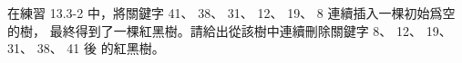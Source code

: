 \startEXERCISE
在練習 13.3-2 中，將關鍵字 41、 38、 31、 12、 19、 8 連續插入一棵初始爲空的樹，
最終得到了一棵紅黑樹。請給出從該樹中連續刪除關鍵字 8、 12、 19、 31、 38、 41 後
的紅黑樹。
\stopEXERCISE

\startANSWER
\startcombination[nx=6,location={top}]
{\externalfigure[e13_4_3-1]}{}
{\externalfigure[e13_4_3-2]}{}
{\externalfigure[e13_4_3-3]}{}
{\externalfigure[e13_4_3-4]}{}
{\externalfigure[e13_4_3-5]}{}
{\externalfigure[e13_4_3-6]}{}
\stopcombination
\stopANSWER
